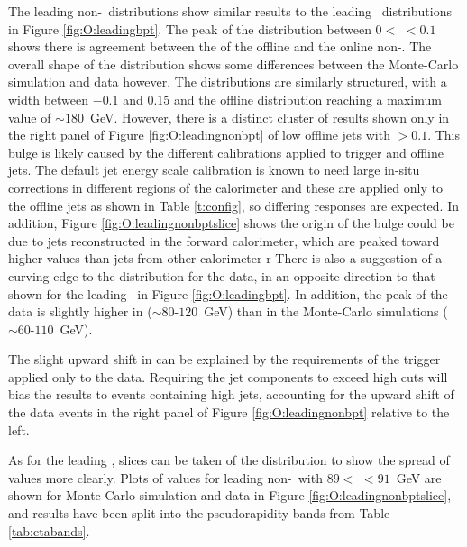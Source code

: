 	The leading non-\bjet\ distributions show similar results to the leading \bjet\ distributions in Figure \ref{fig:O:leadingbpt}. The peak of the distribution between $0<$ \dptpt$<0.1$ shows there is agreement between the \pt of the offline and the online non-\bjet. The overall shape of the distribution shows some differences between the Monte-Carlo simulation and data however. The distributions are similarly structured, with a \dptpt width between $-0.1$ and $0.15$ and the \pt offline distribution reaching a maximum value of $\sim180$~GeV. However, there is a distinct cluster of results shown only in the right panel of Figure \ref{fig:O:leadingnonbpt} of low \pt offline jets with \dptpt$>0.1$. This bulge is likely caused by the different calibrations applied to trigger and offline jets. The default jet energy scale calibration is known to need large in-situ corrections in different regions of the calorimeter and these are applied only to the offline jets as shown in Table \ref{t:config},  so differing responses are expected. In addition, Figure \ref{fig:O:leadingnonbptslice} shows the origin of the bulge could be due to jets reconstructed in the forward calorimeter, which are peaked toward higher \dptpt values than jets from other calorimeter r There is also a suggestion of a curving edge to the distribution for the data, in an opposite direction to that shown for the leading \bjet\ in Figure \ref{fig:O:leadingbpt}. In addition, the peak of the data is slightly higher in \pt ($\sim80$-$120$~GeV) than in the Monte-Carlo simulations ($\sim60$-$110$~GeV).

	The slight upward shift in \pt can be explained by the \pt requirements of the trigger applied only to the data. Requiring the jet components to exceed high \pt cuts will bias the results to events containing high \pt jets, accounting for the upward \pt shift of the data events in the right panel of Figure \ref{fig:O:leadingnonbpt} relative to the left.

	As for the leading \bjet, slices can be taken of the \dptpt distribution to show the spread of values more clearly. Plots of \dptpt values for leading non-\bjets\ with $89<$ \pt$<91$~GeV are shown for Monte-Carlo simulation and data in Figure \ref{fig:O:leadingnonbptslice}, and results have been split into the pseudorapidity bands from Table \ref{tab:etabands}.

